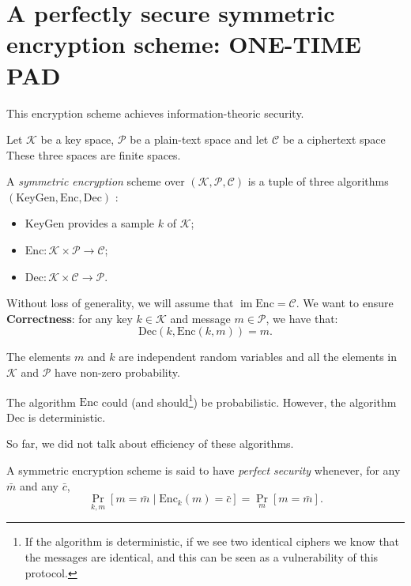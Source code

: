 \documentclass[./main]{subfiles}
\begin{document}
  \chapter{A perfectly secure symmetric encryption scheme: ONE-TIME PAD}

  This encryption scheme achieves information-theoric security.

  \begin{defn}
    Let $\mathcal{K}$ be a key space, $\mathcal{P}$ be a plain-text space and let $\mathcal{C}$ be a ciphertext space
    These three spaces are finite spaces.

    A \textit{symmetric encryption} scheme over $(\mathcal{K}, \mathcal{P}, \mathcal{C})$ is a tuple of three algorithms $(\mathrm{KeyGen}, \mathrm{Enc}, \mathrm{Dec})$ :
    \begin{itemize}
      \item $\mathrm{KeyGen}$ provides a sample $k$ of $\mathcal{K}$;
      \item $\mathrm{Enc} : \mathcal{K} \times \mathcal{P} \to \mathcal{C}$;
      \item $\mathrm{Dec} : \mathcal{K} \times \mathcal{C} \to \mathcal{P}$.
    \end{itemize}
    Without loss of generality, we will assume that $\operatorname{im} \mathrm{Enc} = \mathcal{C}$.
    We want to ensure \textbf{Correctness}: for any key $k \in \mathcal{K}$ and message $m \in \mathcal{P}$, we have that:
  \[
    \mathrm{Dec}(k, \mathrm{Enc}(k, m)) = m
    .\]

    The elements $m$ and $k$ are independent random variables and all the elements in $\mathcal{K}$ and $\mathcal{P}$ have non-zero probability.
  \end{defn}

  \begin{rmk}
    The algorithm $\mathrm{Enc}$ could (and should\footnote{If the algorithm is deterministic, if we see two identical ciphers we know that the messages are identical, and this can be seen as a vulnerability of this protocol.}) be probabilistic.
    However, the algorithm $\mathrm{Dec}$ is deterministic.
    
    So far, we did not talk about efficiency of these algorithms.
  \end{rmk}

  \begin{defn}[Shannon, 1949]
    A symmetric encryption scheme is said to have \textit{perfect security} whenever, for any $\bar{m}$ and any $\bar{c}$, 
    \[
      \Pr_{k,m}[m = \bar{m}  \mid \mathrm{Enc}_k(m) = \bar{c}] = \Pr_{m}[m = \bar{m}]
    .\] 
  \end{defn}
\end{document}
